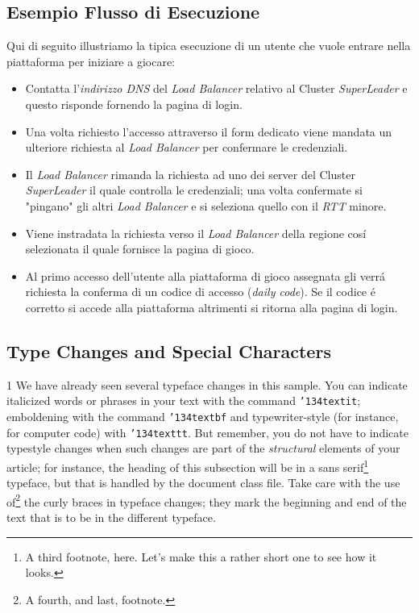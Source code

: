 \documentclass{sig-alternate-05-2015}
\begin{document}
\subsection{Esempio Flusso di Esecuzione}
Qui di seguito illustriamo la tipica esecuzione di un utente che vuole entrare nella piattaforma per iniziare a giocare:
\begin{itemize}
\item Contatta l'\textit{indirizzo DNS} del \textit{Load Balancer} relativo al Cluster \textit{SuperLeader} e questo risponde fornendo la pagina di login.
\item Una volta richiesto l'accesso attraverso il form dedicato viene mandata un ulteriore richiesta al \textit{Load Balancer} per confermare le credenziali. 
\item Il \textit{Load Balancer} rimanda la richiesta ad uno dei server del Cluster \textit{SuperLeader} il quale controlla le credenziali; una volta confermate si "pingano" gli altri \textit{Load Balancer} e si seleziona quello con il \textit{RTT} minore.
\item Viene instradata la richiesta verso il \textit{Load Balancer} della regione cos\'i selezionata il quale fornisce la pagina di gioco.
\item Al primo accesso dell'utente alla piattaforma di gioco assegnata gli verr\'a richiesta la conferma di un codice di accesso (\textit{daily code}). Se il codice \'e corretto si accede alla piattaforma altrimenti si ritorna alla pagina di login.
\end{itemize}








\subsection{Type Changes and {\subsecit Special} Characters}1
We have already seen several typeface changes in this sample.  You
can indicate italicized words or phrases in your text with
the command \texttt{{\char'134}textit}; emboldening with the
command \texttt{{\char'134}textbf}
and typewriter-style (for instance, for computer code) with
\texttt{{\char'134}texttt}.  But remember, you do not
have to indicate typestyle changes when such changes are
part of the \textit{structural} elements of your
article; for instance, the heading of this subsection will
be in a sans serif\footnote{A third footnote, here.
Let's make this a rather short one to
see how it looks.} typeface, but that is handled by the
document class file. Take care with the use
of\footnote{A fourth, and last, footnote.}
the curly braces in typeface changes; they mark
the beginning and end of
the text that is to be in the different typeface.
\end{document}
